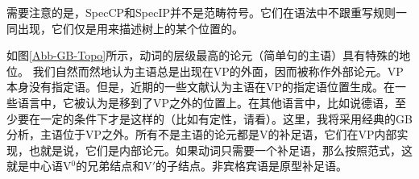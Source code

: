 需要注意的是，SpecCP和SpecIP并不是范畴符号。它们在语法中不跟重写规则一同出现，它们仅是用来描述树上的某个位置的。

如图\ref{Abb-GB-Topo}所示，动词的层级最高的论元（简单句的主语）具有特殊的地位。
我们自然而然地认为主语总是出现在VP的外面，因而被称作外部论元。VP本身没有指定语。但是，近期的一些文献认为主语在VP的指定语位置生成\citep{FS86a-u,KS91a-u}。在一些语言中，它被认为是移到了VP之外的位置上。在其他语言中，比如说德语，至少要在一定的条件下才是这样的（比如有定性，请看\citealp{Diesing92a}）。这里，我将采用经典的GB分析，主语位于VP之外。所有不是主语的论元都是V的补足语，它们在VP内部实现，也就是说，它们是内部论元。如果动词只需要一个补足语，那么按照\xbarc 范式，这就是中心语V$^0$的兄弟结点和V$'$的子结点。非宾格宾语是原型补足语。


